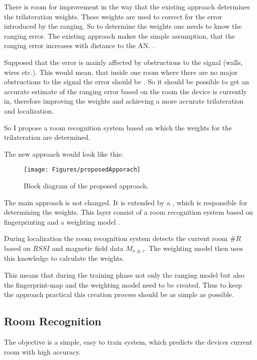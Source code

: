 There is room for improvement in the way that the existing approach determines the trilateration weights. These weights are used to correct for the error introduced by the ranging. So to determine the weights one needs to know the ranging error. The existing approach makes the simple assumption, that the ranging error increases with distance to the AN. .

Supposed that the error is mainly affected by obstructions to the signal (walls, wires etc.). This would mean, that inside one room where there are no major obstructions to the signal the error should be . So it should be possible to get an accurate estimate of the ranging error based on the room the device is currently in, therefore improving the weights and achieving a more accurate trilateration and localization.

So I propose a room recognition system based on which the weights for the trilateration are determined.

\noindent The new approach would look like this:

\begin{figure}[ht]
\centering
\texttt{[image: Figures/proposedApporach]}
\decoRule
\caption[The proposed approach]{Block diagram of the proposed approach.}
\label{fig:proposedApproach}
\end{figure}

The main approach is not changed. It is extended by a , which is responsible for determining the weights. This layer consist of a room recognition system based on fingerprinting and a weighting model .

During localization the room recognition system detects the current room \(\#R\) based on \(RSSI\) and magnetic field data \(M_{x,y,z}\). The weighting model then uses this knowledge to calculate the weights. 

This means that during the training phase not only the ranging model but also the fingerprint-map and the weighting model need to be created. Thus to keep the approach practical this creation process should be as simple as possible.


\subsection{Room Recognition}
The objective is a simple, easy to train system, which predicts the devices current room with high accuracy.

